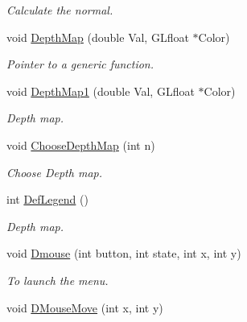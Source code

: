 \begin{DoxyCompactItemize}
\begin{DoxyCompactList}\small\item\em Calculate the normal. \end{DoxyCompactList}\item 
void \hyperlink{classDraw_ab3d9c36aceb9e5f4b158eb15b47c2003}{Depth\+Map} (double Val, G\+Lfloat $\ast$Color)\hypertarget{classDraw_ab3d9c36aceb9e5f4b158eb15b47c2003}{}\label{classDraw_ab3d9c36aceb9e5f4b158eb15b47c2003}

\begin{DoxyCompactList}\small\item\em Pointer to a generic function. \end{DoxyCompactList}\item 
void \hyperlink{classDraw_a6c0ca0bd4c1c0efc555672b6671535bc}{Depth\+Map1} (double Val, G\+Lfloat $\ast$Color)\hypertarget{classDraw_a6c0ca0bd4c1c0efc555672b6671535bc}{}\label{classDraw_a6c0ca0bd4c1c0efc555672b6671535bc}

\begin{DoxyCompactList}\small\item\em Depth map. \end{DoxyCompactList}\item 
void \hyperlink{classDraw_af5edc3c8867513cbb290646b3e0e20ff}{Choose\+Depth\+Map} (int n)\hypertarget{classDraw_af5edc3c8867513cbb290646b3e0e20ff}{}\label{classDraw_af5edc3c8867513cbb290646b3e0e20ff}

\begin{DoxyCompactList}\small\item\em Choose Depth map. \end{DoxyCompactList}\item 
int \hyperlink{classDraw_a5456e2c12fe02429ecf5bc09273ac3ed}{Def\+Legend} ()\hypertarget{classDraw_a5456e2c12fe02429ecf5bc09273ac3ed}{}\label{classDraw_a5456e2c12fe02429ecf5bc09273ac3ed}

\begin{DoxyCompactList}\small\item\em Depth map. \end{DoxyCompactList}\item 
void \hyperlink{classDraw_a8332766d3980ae20e0fb7e2a290a59ea}{Dmouse} (int button, int state, int x, int y)\hypertarget{classDraw_a8332766d3980ae20e0fb7e2a290a59ea}{}\label{classDraw_a8332766d3980ae20e0fb7e2a290a59ea}

\begin{DoxyCompactList}\small\item\em To launch the menu. \end{DoxyCompactList}\item 
void \hyperlink{classDraw_a9794ec43c2f8cf4e106aad7e0c2e1b66}{D\+Mouse\+Move} (int x, int y)\hypertarget{classDraw_a9794ec43c2f8cf4e106aad7e0c2e1b66}{}\label{classDraw_a9794ec43c2f8cf4e106aad7e0c2e1b66}


\end{DoxyCompactItemize}
